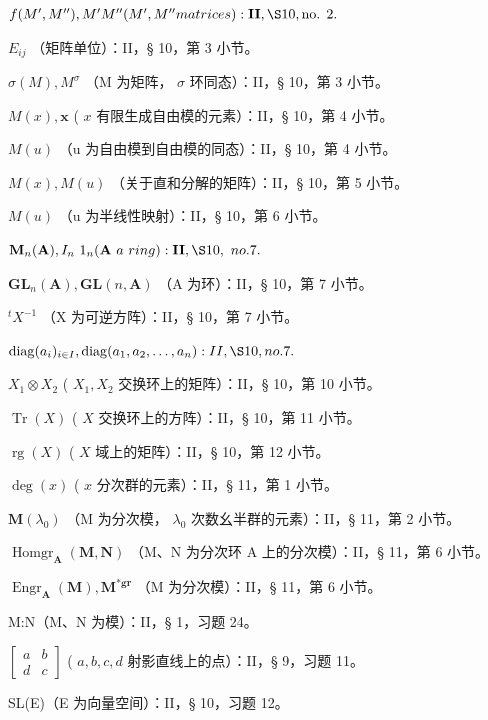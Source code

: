 \(f(M', M''), M'M'' (M', M'' matrices): \mathbf{II}, \S 10, \text{no. } 2.\)

\(E_{ij}\) （矩阵单位）：II，§ 10，第 3 小节。

\(\sigma(M), M^{\sigma}\) （M 为矩阵， \(\sigma\) 环同态）：II，§ 10，第 3 小节。

\(M(x), \mathbf{x}\) ( \(x\) 有限生成自由模的元素）：II，§ 10，第 4 小节。

\(M(u)\) （u 为自由模到自由模的同态）：II，§ 10，第 4 小节。

\(M(x), M(u)\) （关于直和分解的矩阵）：II，§ 10，第 5 小节。

\(M(u)\) （u 为半线性映射）：II，§ 10，第 6 小节。

\(\mathbf{M}_{n}(\mathbf{A}), I_{n} \ 1_{n} (\mathbf{A} \ a \ ring): \mathbf{II}, \S 10, \ no. 7.\)

\(\mathbf{GL}_n(\mathbf{A}), \mathbf{GL}(n, \mathbf{A})\) （A 为环）：II，§ 10，第 7 小节。

\(^{t}X^{-1}\) （X 为可逆方阵）：II，§ 10，第 7 小节。

\(\operatorname{diag}(a_{i})_{i \in I}, \operatorname{diag}(a_{1}, a_{2}, \ldots, a_{n}) : II, \S 10, no. 7.\)

\(X_{1} \otimes X_{2}\) ( \(X_{1}, X_{2}\) 交换环上的矩阵）：II，§ 10，第 10 小节。

\(\operatorname{Tr}(X)\) ( \(X\) 交换环上的方阵）：II，§ 10，第 11 小节。

\(\operatorname{rg}(X)\) ( \(X\) 域上的矩阵）：II，§ 10，第 12 小节。

\(\deg (x)\) ( \(x\) 分次群的元素）：II，§ 11，第 1 小节。

\(\mathbf{M}(\lambda_{0})\) （M 为分次模， \(\lambda_{0}\) 次数幺半群的元素）：II，§ 11，第 2 小节。

\(\operatorname{Homgr}_{\mathbf{A}}(\mathbf{M}, \mathbf{N})\) （M、N 为分次环 A 上的分次模）：II，§ 11，第 6 小节。

\(\operatorname{Engr}_{\mathbf{A}}(\mathbf{M}), \mathbf{M}^{*\mathbf{g}\mathbf{r}}\) （M 为分次模）：II，§ 11，第 6 小节。

M:N（M、N 为模）：II，§ 1，习题 24。

\(\begin{bmatrix} a & b \\ d & c \end{bmatrix}\) ( \(a, b, c, d\) 射影直线上的点）：II，§ 9，习题 11。

SL(E)（E 为向量空间）：II，§ 10，习题 12。

